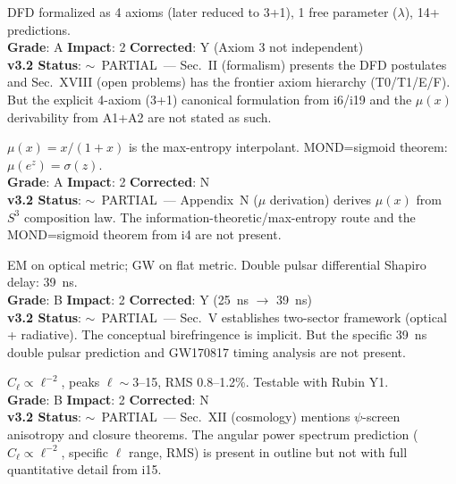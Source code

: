 \documentclass[11pt,a4paper]{article}
\newcommand{\vpartial}{\textcolor{statusPARTIAL}{$\sim$~PARTIAL}}
\begin{document}
\begin{tcolorbox}[colback=major!5,colframe=major,title=\textbf{F19: Canonical Two-Component Framework (4 Axioms, 1 Free Parameter)}]
DFD formalized as 4 axioms (later reduced to 3+1), 1 free parameter ($\lambda$), 14+ predictions.\\
\textbf{Grade}: A \quad \textbf{Impact}: 2 \quad \textbf{Corrected}: Y (Axiom 3 not independent)\\
\textbf{v3.2 Status}: \vpartial\ --- Sec.~II (formalism) presents the DFD postulates and Sec.~XVIII (open problems) has the frontier axiom hierarchy (T0/T1/E/F). But the explicit 4-axiom (3+1) canonical formulation from i6/i19 and the $\mu(x)$ derivability from A1+A2 are not stated as such.
\end{tcolorbox}

\begin{tcolorbox}[colback=major!5,colframe=major,title=\textbf{F20: $\mu(x)$ is Information-Theoretically Forced}]
$\mu(x) = x/(1+x)$ is the max-entropy interpolant. MOND=sigmoid theorem: $\mu(e^z) = \sigma(z)$.\\
\textbf{Grade}: A \quad \textbf{Impact}: 2 \quad \textbf{Corrected}: N\\
\textbf{v3.2 Status}: \vpartial\ --- Appendix~N ($\mu$ derivation) derives $\mu(x)$ from $S^3$ composition law. The information-theoretic/max-entropy route and the MOND=sigmoid theorem from i4 are not present.
\end{tcolorbox}

\begin{tcolorbox}[colback=major!5,colframe=major,title=\textbf{F21: Gravitational Birefringence (EM $\neq$ GW Propagation)}]
EM on optical metric; GW on flat metric. Double pulsar differential Shapiro delay: 39~ns.\\
\textbf{Grade}: B \quad \textbf{Impact}: 2 \quad \textbf{Corrected}: Y (25~ns $\to$ 39~ns)\\
\textbf{v3.2 Status}: \vpartial\ --- Sec.~V establishes two-sector framework (optical + radiative). The conceptual birefringence is implicit. But the specific 39~ns double pulsar prediction and GW170817 timing analysis are not present.
\end{tcolorbox}

\begin{tcolorbox}[colback=major!5,colframe=major,title=\textbf{F22: SNe Ia $\psi$-Screen Anisotropy}]
$C_\ell \propto \ell^{-2}$, peaks $\ell \sim 3$--15, RMS 0.8--1.2\%. Testable with Rubin Y1.\\
\textbf{Grade}: B \quad \textbf{Impact}: 2 \quad \textbf{Corrected}: N\\
\textbf{v3.2 Status}: \vpartial\ --- Sec.~XII (cosmology) mentions $\psi$-screen anisotropy and closure theorems. The angular power spectrum prediction ($C_\ell \propto \ell^{-2}$, specific $\ell$ range, RMS) is present in outline but not with full quantitative detail from i15.
\end{tcolorbox}
\end{document}
